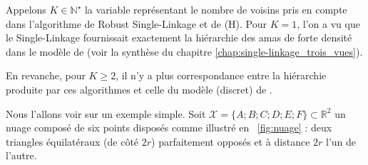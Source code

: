 Appelons $K\in \mathbb N^\star$ la variable représentant le nombre de voisins pris en compte dans l'algorithme de Robust Single-Linkage \cite{RobustSingleLinkage2010} et de (H)\DBSCAN \cite{HDBSCAN, HDBSCAN2017}.
Pour $K = 1$, l'on a vu que le Single-Linkage fournissait exactement la hiérarchie des amas de forte densité dans le modèle de  (voir la synthèse du chapitre \ref{chap:single-linkage_trois_vues}).

En revanche, pour $K\ge2$, il n'y a plus correspondance entre la hiérarchie produite par ces algorithmes et celle du modèle (discret) de . 

Nous l'allons voir sur un exemple simple. Soit $\mathcal X = \bigl\{ A ; B ; C ; D ; E ; F\bigr\} \subset \mathbb R^2$ un nuage composé de six points disposés comme illustré en \Fig~\ref{fig:nuage} : deux triangles équilatéraux (de côté $2r$) parfaitement opposés et à distance $2r$ l'un de l'autre.


